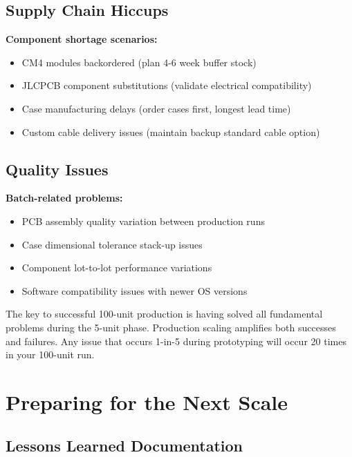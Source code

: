 \subsection{Supply Chain Hiccups}

\textbf{Component shortage scenarios:}
\begin{itemize}
\item CM4 modules backordered (plan 4-6 week buffer stock)
\item JLCPCB component substitutions (validate electrical compatibility)
\item Case manufacturing delays (order cases first, longest lead time)
\item Custom cable delivery issues (maintain backup standard cable option)
\end{itemize}

\subsection{Quality Issues}

\textbf{Batch-related problems:}
\begin{itemize}
\item PCB assembly quality variation between production runs
\item Case dimensional tolerance stack-up issues
\item Component lot-to-lot performance variations
\item Software compatibility issues with newer OS versions
\end{itemize}

\begin{tcolorbox}[colback=red!10,colframe=red!75!black,title=Critical Success Factor]
The key to successful 100-unit production is having solved all fundamental problems during the 5-unit phase. Production scaling amplifies both successes and failures. Any issue that occurs 1-in-5 during prototyping will occur 20 times in your 100-unit run.
\end{tcolorbox}

\section{Preparing for the Next Scale}

\subsection{Lessons Learned Documentation}

